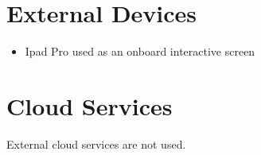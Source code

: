 % 
\section*{External Devices}
\begin{itemize}[nosep]
	\item Ipad Pro used as an onboard interactive screen
\end{itemize}


%
\section*{Cloud Services}
External cloud services are not used.


